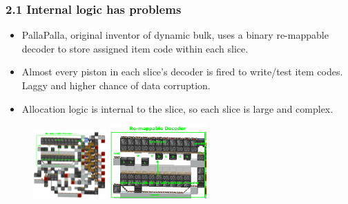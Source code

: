 \documentclass[aspectratio=169]{beamer}
\begin{document}
\begin{frame}
	\frametitle{2.1 Internal logic has problems}

    \begin{itemize}
		\item PallaPalla, original inventor of dynamic bulk, uses a binary re-mappable decoder to store assigned item code within each slice.
		\item Almost every piston in each slice's decoder is fired to write/test item codes. Laggy and higher chance of data corruption.
		\item Allocation logic is internal to the slice, so each slice is large and complex.
	\end{itemize}

    \begin{figure}
        \includegraphics[width=0.25\textwidth]{pallaslice2lbl.png}
        \includegraphics[width=0.33\textwidth]{pallaslice2lblzoom.png}
    \end{figure}

\end{frame}
\end{document}
